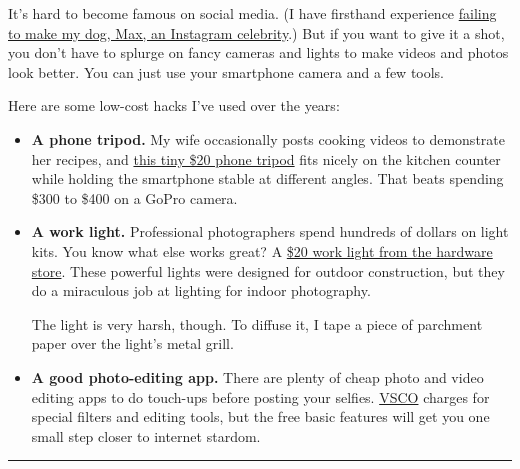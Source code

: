 It's hard to become famous on social media. (I have firsthand experience
\href{https://www.nytimes3xbfgragh.onion/2018/12/05/technology/personaltech/instagram-influencers-dogs-food.html}{failing
to make my dog, Max, an Instagram celebrity}.) But if you want to give
it a shot, you don't have to splurge on fancy cameras and lights to make
videos and photos look better. You can just use your smartphone camera
and a few tools.

Here are some low-cost hacks I've used over the years:

\begin{itemize}
\tightlist
\item
  \textbf{A phone tripod.} My wife occasionally posts cooking videos to
  demonstrate her recipes, and
  \href{https://www.amazon.com/UBeesize-Portable-Adjustable-Universal-Compatible/dp/B06Y2VP3C7}{this
  tiny \$20 phone tripod} fits nicely on the kitchen counter while
  holding the smartphone stable at different angles. That beats spending
  \$300 to \$400 on a GoPro camera.
\end{itemize}

\begin{itemize}
\item
  \textbf{A work light.} Professional photographers spend hundreds of
  dollars on light kits. You know what else works great? A
  \href{https://petapixel.com/2018/07/26/these-portraits-were-shot-with-a-20-work-light-from-home-depot/}{\$20
  work light from the hardware store}. These powerful lights were
  designed for outdoor construction, but they do a miraculous job at
  lighting for indoor photography.

  The light is very harsh, though. To diffuse it, I tape a piece of
  parchment paper over the light's metal grill.
\end{itemize}

\begin{itemize}
\tightlist
\item
  \textbf{A good photo-editing app.} There are plenty of cheap photo and
  video editing apps to do touch-ups before posting your selfies.
  \href{https://apps.apple.com/us/app/vsco-photo-video-editor/id588013838}{VSCO}
  charges for special filters and editing tools, but the free basic
  features will get you one small step closer to internet stardom.
\end{itemize}

\begin{center}\rule{0.5\linewidth}{\linethickness}\end{center}

